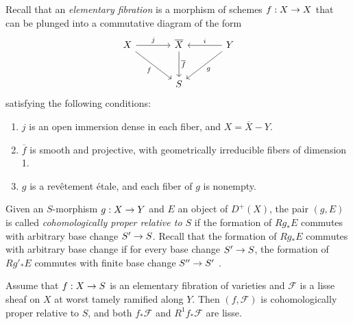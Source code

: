 \documentclass[deligne.tex]{subfiles}
\begin{document}
\subsubsection{}\label{sec:elementary_fibration}
Recall \cite[XI 3.1]{SGAA} that an \emph{elementary fibration} is a morphism
of schemes $f:X\rightarrow X$ that can be plunged into a commutative diagram of the 
form
\begin{equation*}\begin{tikzcd}[row sep=large,column sep=large]
	X\arrow[r,"j"]\arrow[dr,"f"']
	&\overline X\arrow[d,"\overline f"]
	&Y\arrow[l,"i"']\arrow[dl,"g"] \\
	&S
\end{tikzcd}\end{equation*}
satisfying the following conditions:
\begin{enumerate}[label=(\roman*)]
	\item $j$ is an open immersion dense in each fiber, and $X=\overline X-Y$.
	\item $\overline f$ is smooth and projective, with geometrically irreducible fibers of dimension 1.
	\item $g$ is a revêtement étale, and each fiber of $g$ is nonempty.
\end{enumerate}
Given an $S$-morphism $g:X\rightarrow Y$ and $E$ an object of $D^+(X)$, the pair
$(g,E)$ is called \emph{cohomologically proper relative
to $S$} if the formation of $Rg_*E$ commutes with arbitrary base change
$S'\rightarrow S$. Recall that the formation of $Rg_*E$ commutes with arbitrary base
change if for every base change $S'\rightarrow S$, the formation of $Rg'_*E$ 
commutes with finite base change $S''\rightarrow S'$ \cite[1.3]{Illusie}.
\begin{lemma}\label{lem:coh_proper}
	Assume that $f:X\rightarrow S$ is an elementary fibration of varieties and
	$\mathcal F$ is a lisse sheaf on $X$ at worst tamely ramified along $Y$.
	Then $(f,\mathcal F)$ is cohomologically proper relative to $S$, and both
	$f_*\mathcal F$ and $R^1f_*\mathcal F$ are lisse.
\end{lemma}
\end{document}
